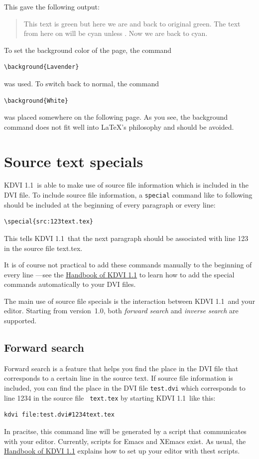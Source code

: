 \documentclass{article}
\newcommand{\KDVI}{{\sf KDVI 1.1}}
\begin{document}
This gave the following output:
\begin{verse}
 \textGreen This text is green but here
we are 
and back to original green.  \textCyan The text from here on will be
cyan unless . Now we are back to
cyan.  \textBlack
\end{verse}

To set the background color of the page, the command
\begin{verbatim}
\background{Lavender}
\end{verbatim}
was used. To switch back to normal, the command
\begin{verbatim}
\background{White}
\end{verbatim}
was placed somewhere on the following page. As you see, the background
command does not fit well into \LaTeX's philosophy and should be
avoided.


\section{Source text specials}

\KDVI\ is able to make use of source file information which is included
in the DVI file. To include source file information, a {\tt special}
command like to following should be included at the beginning of every
paragraph or every line:
\begin{verbatim}
\special{src:123text.tex}
\end{verbatim}
This tells \KDVI\ that the next paragraph should be associated with
line 123 in the source file text.tex.

It is of course not practical to add these commands manually to the
beginning of every line ---see the \href{help:/kdvi}{Handbook of
\KDVI} to learn how to add the special commands automatically to your
DVI files.

The main use of source file specials is the interaction between \KDVI\
and your editor. Starting from version~1.0, both \emph{forward search}
and \emph{inverse search} are supported.

\subsection{Forward search}

Forward search is a feature that helps you find the place in the DVI
file that corresponds to a certain line in the source text. If source
file information is included, you can find the place in the DVI file
{\tt test.dvi} which corresponds to line 1234 in the source file {\tt
text.tex} by starting \KDVI\ like this:
\begin{verbatim}
kdvi file:test.dvi#1234text.tex
\end{verbatim}
In pracitse, this command line will be generated by a script that
communicates with your editor. Currently, scripts for Emacs and XEmacs
exist. As usual, the \href{help:/kdvi/forward-search.html}{Handbook of
\KDVI} explains how to set up your editor with thest scripts.
\end{document}
